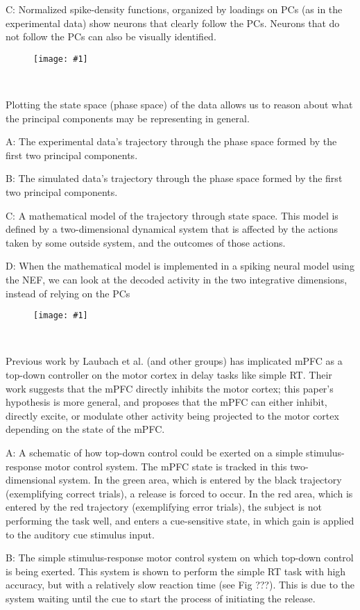 \documentclass[12pt]{article}
\newcommand{\scalefigone}[3]{
  \begin{figure}[ht!]
    \centering
    \texttt{[image: \#1]}
    \caption{#3}
    \label{#1}
  \end{figure}}
\begin{document}
C: Normalized spike-density functions,
organized by loadings on PCs (as in the experimental data)
show neurons that clearly follow the PCs.
Neurons that do not follow the PCs
can also be visually identified.

\clearpage

\scalefigone{f4_traj.pdf}{1.0}{~}

Plotting the state space (phase space) of the data
allows us to reason about what the principal components
may be representing in general.

A: The experimental data's trajectory
through the phase space formed by the first two
principal components.

B: The simulated data's trajectory
through the phase space formed by the first two
principal components.

C: A mathematical model of the trajectory
through state space.
This model is defined by a two-dimensional
dynamical system that is affected
by the actions taken by some outside system,
and the outcomes of those actions.

D: When the mathematical model is implemented
in a spiking neural model using the NEF,
we can look at the decoded activity in the
two integrative dimensions,
instead of relying on the PCs

\clearpage

\scalefigone{f5_tdcontrol.pdf}{1.0}{~}

Previous work by Laubach et al. (and other groups)
has implicated mPFC as a top-down controller
on the motor cortex in delay tasks like simple RT.
Their work suggests that the mPFC directly inhibits
the motor cortex; this paper's hypothesis
is more general, and proposes that the mPFC
can either inhibit, directly excite,
or modulate other activity being projected
to the motor cortex
depending on the state of the mPFC.

A: A schematic of how top-down control
could be exerted on a simple stimulus-response
motor control system.
The mPFC state is tracked in this two-dimensional system.
In the green area, which is entered
by the black trajectory
(exemplifying correct trials),
a release is forced to occur.
In the red area, which is entered
by the red trajectory
(exemplifying error trials),
the subject is not performing the task well,
and enters a cue-sensitive state,
in which gain is applied
to the auditory cue stimulus input.

B: The simple stimulus-response motor control system
on which top-down control is being exerted.
This system is shown to perform the simple RT task
with high accuracy,
but with a relatively slow reaction time
(see Fig ???).
This is due to the system waiting until the cue
to start the process of initiating the release.
\end{document}
